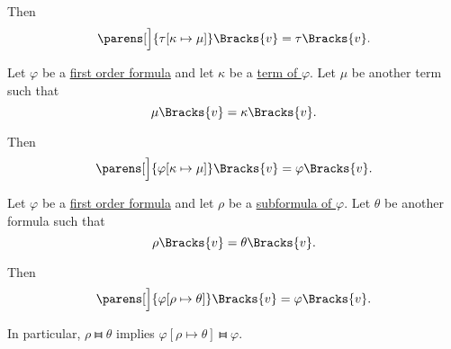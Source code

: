 \begin{proposition}
\begin{propenum}
    Then
    \begin{equation}\label{eq:thm:first_order_substitution_equivalence/term_in_term}
      \parens[\Big]{ \tau[\kappa \mapsto \mu] }\Bracks{v} = \tau\Bracks{v}.
    \end{equation}

     Let \( \varphi \) be a \hyperref[def:first_order_syntax/formula]{first order formula} and let \( \kappa \) be a \hyperref[def:first_order_syntax/formula_terms]{term of \( \varphi \)}. Let \( \mu \) be another term such that
    \begin{equation}\label{eq:thm:first_order_substitution_equivalence/term_in_formula/compatibility}
      \mu\Bracks{v} = \kappa\Bracks{v}.
    \end{equation}

    Then
    \begin{equation}\label{eq:thm:first_order_substitution_equivalence/term_in_formula}
      \parens[\Big]{ \varphi[\kappa \mapsto \mu] }\Bracks{v} = \varphi\Bracks{v}.
    \end{equation}

     Let \( \varphi \) be a \hyperref[def:first_order_syntax/formula]{first order formula} and let \( \rho \) be a \hyperref[def:first_order_syntax/subformula]{subformula of \( \varphi \)}. Let \( \theta \) be another formula such that
    \begin{equation}\label{eq:thm:first_order_substitution_equivalence/formula_in_formula/compatibility}
      \rho\Bracks{v} = \theta\Bracks{v}.
    \end{equation}

    Then
    \begin{equation}\label{eq:thm:first_order_substitution_equivalence/formula_in_formula}
      \parens[\Big]{ \varphi[\rho \mapsto \theta] }\Bracks{v} = \varphi\Bracks{v}.
    \end{equation}

    In particular, \( \rho \gleichstark \theta \) implies \( \varphi[\rho \mapsto \theta] \gleichstark \varphi \).
  \end{propenum}
\end{proposition}
